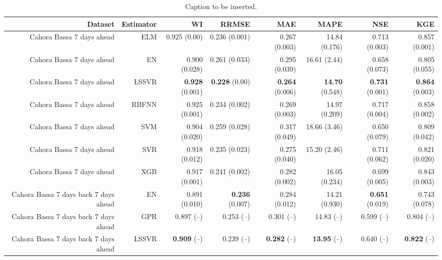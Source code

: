 \begin{table}
\centering
\caption{Caption to be inserted.}
\label{eml_____comparison_datasets_table}
\begin{tabular}{rrrrrrrr}
\toprule
                               Dataset & Estimator &                    WI &                 RRMSE &                   MAE &                  MAPE &                   NSE &                   KGE \\
\midrule
            Cahora Bassa 7 days ahead  &       ELM &          0.925 (0.00) &         0.236 (0.001) &         0.267 (0.003) &         14.84 (0.176) &         0.713 (0.003) &         0.857 (0.001) \\
            Cahora Bassa 7 days ahead  &        EN &         0.900 (0.028) &         0.261 (0.033) &         0.295 (0.039) &          16.61 (2.44) &         0.658 (0.073) &         0.805 (0.055) \\
            Cahora Bassa 7 days ahead  &     LSSVR &  { \bf 0.928} (0.001) &   { \bf 0.228} (0.00) &  { \bf 0.264} (0.006) &  { \bf 14.70} (0.548) &  { \bf 0.731} (0.001) &  { \bf 0.864} (0.003) \\
            Cahora Bassa 7 days ahead  &     RBFNN &         0.925 (0.001) &         0.234 (0.002) &         0.269 (0.003) &         14.97 (0.209) &         0.717 (0.004) &         0.858 (0.002) \\
            Cahora Bassa 7 days ahead  &       SVM &         0.904 (0.020) &         0.259 (0.028) &         0.317 (0.049) &          18.66 (3.46) &         0.650 (0.079) &         0.809 (0.042) \\
            Cahora Bassa 7 days ahead  &       SVR &         0.918 (0.012) &         0.235 (0.023) &         0.275 (0.040) &          15.20 (2.46) &         0.711 (0.062) &         0.821 (0.020) \\
            Cahora Bassa 7 days ahead  &       XGB &         0.917 (0.001) &         0.241 (0.002) &         0.282 (0.002) &         16.05 (0.234) &         0.699 (0.005) &         0.843 (0.003) \\
 Cahora Bassa 7 days back 7 days ahead &        EN &         0.891 (0.010) &  { \bf 0.236} (0.007) &         0.284 (0.012) &         14.21 (0.930) &  { \bf 0.651} (0.019) &         0.743 (0.078) \\
 Cahora Bassa 7 days back 7 days ahead &       GPR &            0.897 (--) &            0.253 (--) &            0.301 (--) &            14.83 (--) &            0.599 (--) &            0.804 (--) \\
 Cahora Bassa 7 days back 7 days ahead &     LSSVR &     { \bf 0.909} (--) &            0.239 (--) &     { \bf 0.282} (--) &     { \bf 13.95} (--) &            0.640 (--) &     { \bf 0.822} (--) \\
\bottomrule
\end{tabular}
\end{table}
